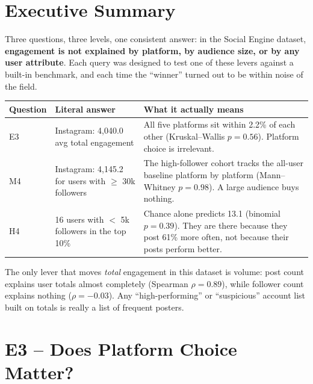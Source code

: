 \documentclass[11pt,a4paper]{article}
\begin{document}
\color{bodytext}

\section{Executive Summary}

Three questions, three levels, one consistent answer: in the Social Engine dataset, \textbf{engagement is not explained by platform, by audience size, or by any user attribute}. Each query was designed to test one of these levers against a built-in benchmark, and each time the ``winner'' turned out to be within noise of the field.

\begin{table}[H]
\centering\small
\begin{tabular}{@{}lp{4.6cm}p{6.6cm}@{}}
\toprule
\textbf{Question} & \textbf{Literal answer} & \textbf{What it actually means} \\
\midrule
E3 & Instagram: 4,040.0 avg total engagement & All five platforms sit within 2.2\% of each other (Kruskal--Wallis $p = 0.56$). Platform choice is irrelevant. \\
M4 & Instagram: 4,145.2 for users with $\geq$ 30k followers & The high-follower cohort tracks the all-user baseline platform by platform (Mann--Whitney $p = 0.98$). A large audience buys nothing. \\
H4 & 16 users with $<$ 5k followers in the top 10\% & Chance alone predicts 13.1 (binomial $p = 0.39$). They are there because they post 61\% more often, not because their posts perform better. \\
\bottomrule
\end{tabular}
\end{table}

\begin{insightbox}[HEADLINE]
The only lever that moves \emph{total} engagement in this dataset is volume: post count explains user totals almost completely (Spearman $\rho = 0.89$), while follower count explains nothing ($\rho = -0.03$). Any ``high-performing'' or ``suspicious'' account list built on totals is really a list of frequent posters.
\end{insightbox}

\section{E3 -- Does Platform Choice Matter?}
\end{document}
